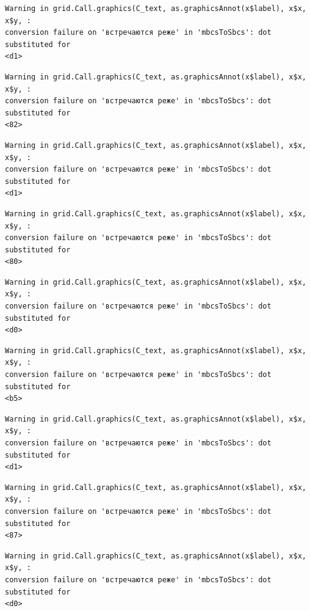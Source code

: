 \documentclass[
  letterpaper,
]{scrbook}
\theoremstyle{definition}
\theoremstyle{remark}
\begin{document}
\begin{verbatim}
Warning in grid.Call.graphics(C_text, as.graphicsAnnot(x$label), x$x, x$y, :
conversion failure on 'встречаются реже' in 'mbcsToSbcs': dot substituted for
<d1>
\end{verbatim}

\begin{verbatim}
Warning in grid.Call.graphics(C_text, as.graphicsAnnot(x$label), x$x, x$y, :
conversion failure on 'встречаются реже' in 'mbcsToSbcs': dot substituted for
<82>
\end{verbatim}

\begin{verbatim}
Warning in grid.Call.graphics(C_text, as.graphicsAnnot(x$label), x$x, x$y, :
conversion failure on 'встречаются реже' in 'mbcsToSbcs': dot substituted for
<d1>
\end{verbatim}

\begin{verbatim}
Warning in grid.Call.graphics(C_text, as.graphicsAnnot(x$label), x$x, x$y, :
conversion failure on 'встречаются реже' in 'mbcsToSbcs': dot substituted for
<80>
\end{verbatim}

\begin{verbatim}
Warning in grid.Call.graphics(C_text, as.graphicsAnnot(x$label), x$x, x$y, :
conversion failure on 'встречаются реже' in 'mbcsToSbcs': dot substituted for
<d0>
\end{verbatim}

\begin{verbatim}
Warning in grid.Call.graphics(C_text, as.graphicsAnnot(x$label), x$x, x$y, :
conversion failure on 'встречаются реже' in 'mbcsToSbcs': dot substituted for
<b5>
\end{verbatim}

\begin{verbatim}
Warning in grid.Call.graphics(C_text, as.graphicsAnnot(x$label), x$x, x$y, :
conversion failure on 'встречаются реже' in 'mbcsToSbcs': dot substituted for
<d1>
\end{verbatim}

\begin{verbatim}
Warning in grid.Call.graphics(C_text, as.graphicsAnnot(x$label), x$x, x$y, :
conversion failure on 'встречаются реже' in 'mbcsToSbcs': dot substituted for
<87>
\end{verbatim}

\begin{verbatim}
Warning in grid.Call.graphics(C_text, as.graphicsAnnot(x$label), x$x, x$y, :
conversion failure on 'встречаются реже' in 'mbcsToSbcs': dot substituted for
<d0>
\end{verbatim}
\end{document}
